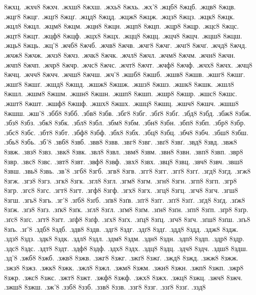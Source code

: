 {8жхц.
.жхч8
8жхч.
.жхш8
8жхш.
.жхь8
8жхь.
.жх'8
.жцб8
8жцб.
.жцв8
8жцв.
.жцг8
8жцг.
.жцґ8
8жцґ.
.жцд8
8жцд.
.жцж8
8жцж.
.жцз8
8жцз.
.жцк8
8жцк.
.жцл8
8жцл.
.жцм8
8жцм.
.жцн8
8жцн.
.жцп8
8жцп.
.жцр8
8жцр.
.жцс8
8жцс.
.жцт8
8жцт.
.жцф8
8жцф.
.жцх8
8жцх.
.жцц8
8жцц.
.жцч8
8жцч.
.жцш8
8жцш.
.жць8
8жць.
.жц'8
.жчб8
8жчб.
.жчв8
8жчв.
.жчг8
8жчг.
.жчґ8
8жчґ.
.жчд8
8жчд.
.жчж8
8жчж.
.жчз8
8жчз.
.жчк8
8жчк.
.жчл8
8жчл.
.жчм8
8жчм.
.жчн8
8жчн.
.жчп8
8жчп.
.жчр8
8жчр.
.жчс8
8жчс.
.жчт8
8жчт.
.жчф8
8жчф.
.жчх8
8жчх.
.жчц8
8жчц.
.жчч8
8жчч.
.жчш8
8жчш.
.жч'8
.жшб8
8жшб.
.жшв8
8жшв.
.жшг8
8жшг.
.жшґ8
8жшґ.
.жшд8
8жшд.
.жшж8
8жшж.
.жшз8
8жшз.
.жшк8
8жшк.
.жшл8
8жшл.
.жшм8
8жшм.
.жшн8
8жшн.
.жшп8
8жшп.
.жшр8
8жшр.
.жшс8
8жшс.
.жшт8
8жшт.
.жшф8
8жшф.
.жшх8
8жшх.
.жшц8
8жшц.
.жшч8
8жшч.
.жшш8
8жшш.
.жш'8
.збб8
8збб.
.збв8
8збв.
.збг8
8збг.
.збґ8
8збґ.
.збд8
8збд.
.збж8
8збж.
.збз8
8збз.
.збк8
8збк.
.збл8
8збл.
.збм8
8збм.
.збн8
8збн.
.збп8
8збп.
.збр8
8збр.
.збс8
8збс.
.збт8
8збт.
.збф8
8збф.
.збх8
8збх.
.збц8
8збц.
.збч8
8збч.
.збш8
8збш.
.збь8
8збь.
.зб'8
.звб8
8звб.
.звв8
8звв.
.звг8
8звг.
.звґ8
8звґ.
.звд8
8звд.
.звж8
8звж.
.звз8
8звз.
.звк8
8звк.
.звл8
8звл.
.звм8
8звм.
.звн8
8звн.
.звп8
8звп.
.звр8
8звр.
.звс8
8звс.
.звт8
8звт.
.звф8
8звф.
.звх8
8звх.
.звц8
8звц.
.звч8
8звч.
.звш8
8звш.
.звь8
8звь.
.зв'8
.згб8
8згб.
.згв8
8згв.
.згг8
8згг.
.згґ8
8згґ.
.згд8
8згд.
.згж8
8згж.
.згз8
8згз.
.згк8
8згк.
.згл8
8згл.
.згм8
8згм.
.згн8
8згн.
.згп8
8згп.
.згр8
8згр.
.згс8
8згс.
.згт8
8згт.
.згф8
8згф.
.згх8
8згх.
.згц8
8згц.
.згч8
8згч.
.згш8
8згш.
.згь8
8згь.
.зг'8
.зґб8
8зґб.
.зґв8
8зґв.
.зґг8
8зґг.
.зґґ8
8зґґ.
.зґд8
8зґд.
.зґж8
8зґж.
.зґз8
8зґз.
.зґк8
8зґк.
.зґл8
8зґл.
.зґм8
8зґм.
.зґн8
8зґн.
.зґп8
8зґп.
.зґр8
8зґр.
.зґс8
8зґс.
.зґт8
8зґт.
.зґф8
8зґф.
.зґх8
8зґх.
.зґц8
8зґц.
.зґч8
8зґч.
.зґш8
8зґш.
.зґь8
8зґь.
.зґ'8
.здб8
8здб.
.здв8
8здв.
.здг8
8здг.
.здґ8
8здґ.
.здд8
8здд.
.здж8
8здж.
.здз8
8здз.
.здк8
8здк.
.здл8
8здл.
.здм8
8здм.
.здн8
8здн.
.здп8
8здп.
.здр8
8здр.
.здс8
8здс.
.здт8
8здт.
.здф8
8здф.
.здх8
8здх.
.здц8
8здц.
.здч8
8здч.
.здш8
8здш.
.зд'8
.зжб8
8зжб.
.зжв8
8зжв.
.зжг8
8зжг.
.зжґ8
8зжґ.
.зжд8
8зжд.
.зжж8
8зжж.
.зжз8
8зжз.
.зжк8
8зжк.
.зжл8
8зжл.
.зжм8
8зжм.
.зжн8
8зжн.
.зжп8
8зжп.
.зжр8
8зжр.
.зжс8
8зжс.
.зжт8
8зжт.
.зжф8
8зжф.
.зжх8
8зжх.
.зжц8
8зжц.
.зжч8
8зжч.
.зжш8
8зжш.
.зж'8
.ззб8
8ззб.
.ззв8
8ззв.
.ззг8
8ззг.
.ззґ8
8ззґ.
.ззд8
}
